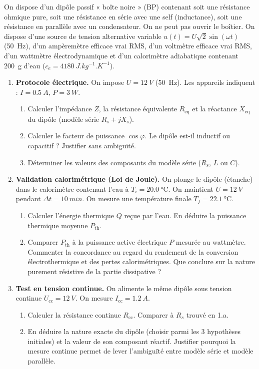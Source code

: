 \documentclass[11pt]{article}
\begin{document}
\begin{exercice}
On dispose d'un dipôle passif « boîte noire » (BP) contenant soit une résistance ohmique pure, soit une résistance en série avec une self (inductance), soit une résistance en parallèle avec un condensateur. On ne peut pas ouvrir le boîtier. On dispose d'une source de tension alternative variable $u(t) = U\sqrt{2}\sin(\omega t)$ (\SI{50}{Hz}), d'un ampèremètre efficace vrai RMS, d'un voltmètre efficace vrai RMS, d'un wattmètre électrodynamique et d'un calorimètre adiabatique contenant \SI{200}{g} d'eau ($c_e = \SI{4180}{J.kg^{-1}.K^{-1}}$).

\begin{enumerate}
\item \textbf{Protocole électrique.} 
On impose $U = \SI{12}{V}$ (\SI{50}{Hz}). Les appareils indiquent : $I = \SI{0,5}{A}$, $P = \SI{3}{W}$.
\begin{enumerate}[label=\alph*)]
\item Calculer l'impédance $Z$, la résistance équivalente $R_{\text{eq}}$ et la réactance $X_{\text{eq}}$ du dipôle (modèle série $R_s + jX_s$).
\item Calculer le facteur de puissance $\cos\varphi$. Le dipôle est-il inductif ou capacitif ? Justifier sans ambiguïté.
\item Déterminer les valeurs des composants du modèle série ($R_s$, $L$ ou $C$).
\end{enumerate}
\item \textbf{Validation calorimétrique (Loi de Joule).} 
On plonge le dipôle (étanche) dans le calorimètre contenant l'eau à $T_i = \SI{20,0}{\celsius}$. On maintient $U = \SI{12}{V}$ pendant $\Delta t = \SI{10}{min}$. On mesure une température finale $T_f = \SI{22,1}{\celsius}$.
\begin{enumerate}[label=\alph*)]
\item Calculer l'énergie thermique $Q$ reçue par l'eau. En déduire la puissance thermique moyenne $P_{\text{th}}$.
\item Comparer $P_{\text{th}}$ à la puissance active électrique $P$ mesurée au wattmètre. Commenter la concordance au regard du rendement de la conversion électrothermique et des pertes calorimétriques. Que conclure sur la nature purement résistive de la partie dissipative ?
\end{enumerate}
\item \textbf{Test en tension continue.} 
On alimente le même dipôle sous tension continue $U_{\text{cc}} = \SI{12}{V}$. On mesure $I_{\text{cc}} = \SI{1,2}{A}$.
\begin{enumerate}[label=\alph*)]
\item Calculer la résistance continue $R_{\text{cc}}$. Comparer à $R_s$ trouvé en 1.a.
\item En déduire la nature exacte du dipôle (choisir parmi les 3 hypothèses initiales) et la valeur de son composant réactif. Justifier pourquoi la mesure continue permet de lever l'ambiguïté entre modèle série et modèle parallèle.
\end{enumerate}
\end{enumerate}
\end{exercice}
\end{document}
